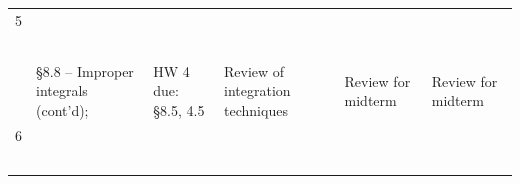 \documentclass[11pt]{article}
\begin{document}
\begin{table}[ht!]
{\begin{tabular}{ | l | l | l | l | l | l |}
5 & \begin{minipage}{0.18\textwidth}
{\bf June 14}\\
\end{minipage}
& \begin{minipage}{.18\textwidth}
{\bf June 15}\\
\end{minipage}
& \begin{minipage}{.18\textwidth}
{\bf June 16}\\
\end{minipage}
& \begin{minipage}{.18\textwidth}
{\bf June 17}\\
\end{minipage}
& \begin{minipage}{.18\textwidth}
{\bf June 18}\\
\end{minipage}\\

 & \begin{minipage}{0.18\textwidth}
\S 8.8 -- Improper integrals (cont'd);
\end{minipage}
& \begin{minipage}{.18\textwidth}
HW 4 due: \S 8.5, 4.5
\end{minipage}
& \begin{minipage}{.18\textwidth}
Review of integration techniques
\end{minipage}
& \begin{minipage}{.18\textwidth}
Review for midterm
\end{minipage}
& \begin{minipage}{.18\textwidth}
Review for midterm
\end{minipage}\\
\hline

6 & \begin{minipage}{0.18\textwidth}
{\bf June 21}\\
\end{minipage}
& \begin{minipage}{.18\textwidth}
{\bf June 22}\\
\end{minipage}
& \begin{minipage}{.18\textwidth}
{\bf June 23}\\
\end{minipage}
& \begin{minipage}{.18\textwidth}
{\bf June 24}\\
\end{minipage}
& \begin{minipage}{.18\textwidth}
{\bf June 25}\\
\end{minipage}\\


\end{tabular}}
\end{table}
\end{document}
